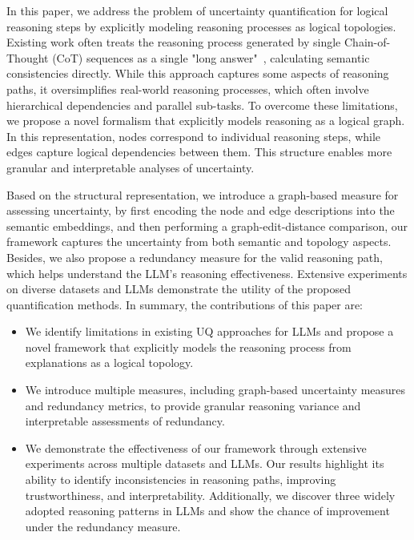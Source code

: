 In this paper, we address the problem of uncertainty quantification for logical reasoning steps by explicitly modeling reasoning processes as logical topologies. Existing work often treats the reasoning process generated by single Chain-of-Thought (CoT) sequences as a single "long answer"~\cite{wei2022CoT,wang2023CoT_cue}, calculating semantic consistencies directly. While this approach captures some aspects of reasoning paths, it oversimplifies real-world reasoning processes, which often involve hierarchical dependencies and parallel sub-tasks. To overcome these limitations, we propose a novel formalism that explicitly models reasoning as a logical graph. In this representation, nodes correspond to individual reasoning steps, while edges capture logical dependencies between them. This structure enables more granular and interpretable analyses of uncertainty.

Based on the structural representation, we introduce a graph-based measure for assessing uncertainty, by first encoding the node and edge descriptions into the semantic embeddings, and then performing a graph-edit-distance comparison, our framework captures the uncertainty from both semantic and topology aspects. Besides, we also propose a redundancy measure for the valid reasoning path, which helps understand the LLM's reasoning effectiveness. %
Extensive experiments on diverse datasets and LLMs demonstrate the utility of the proposed quantification methods.
In summary, the contributions of this paper are:
\begin{itemize}
\item We identify limitations in existing UQ approaches for LLMs and propose a novel framework that explicitly models the reasoning process from explanations as a logical topology. 
\item We introduce multiple measures, including graph-based uncertainty measures and redundancy metrics, to provide granular reasoning variance and interpretable assessments of redundancy. 
\item We demonstrate the effectiveness of our framework through extensive experiments across multiple datasets and LLMs. Our results highlight its ability to identify inconsistencies in reasoning paths, improving trustworthiness, and interpretability. Additionally, we discover three widely adopted reasoning patterns in LLMs and show the chance of improvement under the redundancy measure.
\end{itemize}


